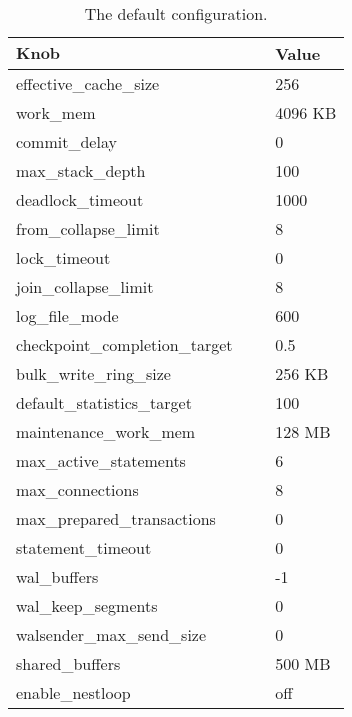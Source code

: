 \vspace{-1em}
\begin{table}[H]
\caption{The default configuration.}
\centering  
	\begin{tabular}{lll}\hline
	$\textbf{Knob}$ & & \textbf{Value} \\\hline
	effective\_cache\_size & $\ \ \ $ & 256 \\
	work\_mem & $\ \ \ $ & 4096 KB \\
	commit\_delay & $\ \ \ $ & 0 \\
	max\_stack\_depth & $\ \ \ $ & 100 \\
	deadlock\_timeout & $\ \ \ $ & 1000 \\
	from\_collapse\_limit & $\ \ \ $ & 8 \\
	lock\_timeout & $\ \ \ $ & 0 \\
	join\_collapse\_limit & $\ \ \ $ & 8 \\	
	log\_file\_mode & $\ \ \ $ & 600 \\
	checkpoint\_completion\_target & $\ \ \ $ & 0.5 \\
	bulk\_write\_ring\_size  & $\ \ \ $ & 256 KB \\ %
	default\_statistics\_target & $\ \ \ $ & 100 \\
	maintenance\_work\_mem & $\ \ \ $ & 128 MB \\
	max\_active\_statements & $\ \ \ $ & 6 \\
	max\_connections & $\ \ \ $ & 8 \\
	max\_prepared\_transactions & $\ \ \ $ & 0 \\
	statement\_timeout & $\ \ \ $ & 0 \\
	wal\_buffers & $\ \ \ $ & -1 \\
	wal\_keep\_segments & $\ \ \ $ & 0 \\
	walsender\_max\_send\_size & $\ \ \ $ & 0 \\
	shared\_buffers & $\ \ \ $ & 500 MB \\
	enable\_nestloop & $\ \ \ $ & off \\\hline
	\end{tabular} 
\label{tbl:knobDefault}    
\end{table} 

